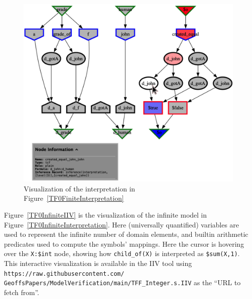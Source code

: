 \documentclass[letterpaper]{article}
\newcommand{\smalltt}[1]{\small \texttt{#1}}
\begin{document}
\begin{figure}[htbp]
\includegraphics[width=\columnwidth]{TFF_Finite.s.IIV.pdf}
\caption{Visualization of the interpretation in Figure~\ref{TF0FiniteInterpretation}}
\label{TF0FiniteIIV}
\end{figure}

Figure~\ref{TF0InfiniteIIV} is the visualization of the infinite model in 
Figure~\ref{TF0InfiniteInterpretation}. 
Here (universally quantified) variables are used to represent the infinite number of
domain elements, and builtin arithmetic predicates used to compute the symbols' mappings.
Here the cursor is hovering over the {\smalltt{X:\$int}} node, showing how 
{\smalltt{child\_of(X)}} is interpreted as {\smalltt{\$sum(X,1)}}.
This interactive visualization is available in the IIV tool using 
{\scriptsize {\tt https://raw.githubusercontent.com/ GeoffsPapers/ModelVerification/main/TFF\_Integer.s.IIV}}
as the ``URL to fetch from''.
\end{document}
